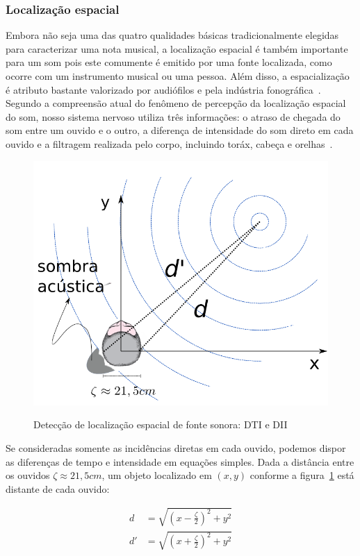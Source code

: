 \subsubsection{Localização espacial}
Embora não seja uma das quatro qualidades básicas tradicionalmente elegidas para caracterizar uma nota musical,
a localização espacial é também importante para um som
pois este comumente é emitido por uma fonte localizada, como ocorre com um instrumento musical ou uma pessoa. Além disso, a espacialização é atributo bastante valorizado
 por audiófilos e pela indústria fonográfica~\cite{floEsp}.
Segundo a compreensão atual do fenômeno de percepção da localização espacial do som, nosso sistema nervoso utiliza
três informações: o atraso de chegada do som entre um ouvido e o outro, a diferença de intensidade do som direto em cada ouvido e a 
filtragem realizada pelo corpo, incluindo toráx, cabeça e orelhas~\cite{Roederer, hrtf, Heeger}.


\begin{figure}[h!]
    \centering
    \caption{Detecção de localização espacial de fonte sonora: DTI e DII}
        \includegraphics[width=.5\textwidth]{figuras/espacializacao___}
        \label{fig:spac}
\end{figure}



	Se consideradas somente as incidências diretas em cada ouvido, podemos dispor as diferenças de tempo e intensidade em equações simples. Dada a distância entre os ouvidos $\zeta\approx 21,5cm$,
um objeto localizado em $(x,y)$ conforme a figura~\ref{fig:spac}
está distante de cada ouvido:

\begin{equation}
\begin{split}
d & =\sqrt{\left (x-\frac{\zeta}{2} \right )^2+y^2} \\
d' & =\sqrt{\left (x+\frac{\zeta}{2} \right )^2 + y^2}
\end{split}
\end{equation}



